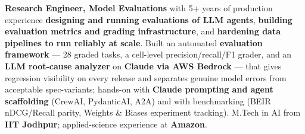 \documentclass[letter,10pt]{article}
\begin{document}

\textbf{Research Engineer, Model Evaluations} with 5+ years of production experience \textbf{designing and running evaluations of LLM agents}, \textbf{building evaluation metrics and grading infrastructure}, and \textbf{hardening data pipelines to run reliably at scale}.
Built an automated \textbf{evaluation framework} --- 28 graded tasks, a cell-level precision/recall/F1 grader, and an \textbf{LLM root-cause analyzer} on \textbf{Claude via AWS Bedrock} --- that gives regression visibility on every release and separates genuine model errors from acceptable spec-variants; hands-on with \textbf{Claude prompting and agent scaffolding} (CrewAI, PydanticAI, A2A) and with benchmarking (BEIR nDCG/Recall parity, Weights \& Biases experiment tracking).
M.Tech in AI from \textbf{IIT Jodhpur}; applied-science experience at \textbf{Amazon}.
\end{document}
